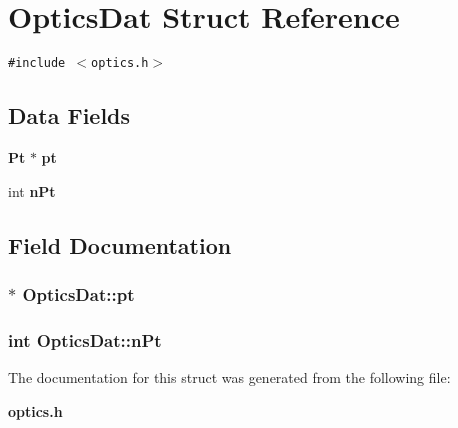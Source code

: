 \section{OpticsDat Struct Reference}
\label{structOpticsDat}
{\tt \#include $<$optics.h$>$}

\subsection*{Data Fields}
\begin{CompactItemize}
\item 
{\bf Pt} $\ast$ {\bf pt}
\item 
int {\bf nPt}
\end{CompactItemize}


\subsection{Field Documentation}
\subsubsection{$\ast$ {\bf OpticsDat::pt}}\label{structOpticsDat_51840d3577ce2e355f0de84b803a9347}


\subsubsection{\setlength{\rightskip}{0pt plus 5cm}int {\bf OpticsDat::nPt}}\label{structOpticsDat_964ef51ecad56e395a7d8a43a3428ea1}




The documentation for this struct was generated from the following file:\begin{CompactItemize}
\item 
{\bf optics.h}\end{CompactItemize}
